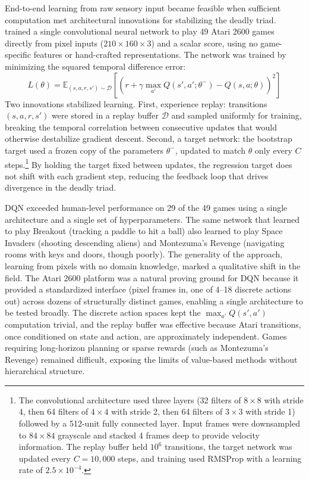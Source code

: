 End-to-end learning from raw sensory input became feasible when sufficient computation met architectural innovations for stabilizing the deadly triad. \citet{mnih2015} trained a single convolutional neural network to play 49 Atari 2600 games directly from pixel inputs ($210 \times 160 \times 3$) and a scalar score, using no game-specific features or hand-crafted representations. The network was trained by minimizing the squared temporal difference error:
\begin{equation}
L(\theta) = \mathbb{E}_{(s,a,r,s') \sim \mathcal{D}} \left[ \left( r + \gamma \max_{a'} Q(s', a'; \theta^-) - Q(s, a; \theta) \right)^2 \right]
\end{equation}
Two innovations stabilized learning. First, experience replay: transitions $(s, a, r, s')$ were stored in a replay buffer $\mathcal{D}$ and sampled uniformly for training, breaking the temporal correlation between consecutive updates that would otherwise destabilize gradient descent. Second, a target network: the bootstrap target used a frozen copy of the parameters $\theta^-$, updated to match $\theta$ only every $C$ steps.\footnote{The convolutional architecture used three layers (32 filters of $8 \times 8$ with stride 4, then 64 filters of $4 \times 4$ with stride 2, then 64 filters of $3 \times 3$ with stride 1) followed by a 512-unit fully connected layer. Input frames were downsampled to $84 \times 84$ grayscale and stacked 4 frames deep to provide velocity information. The replay buffer held $10^6$ transitions, the target network was updated every $C = 10{,}000$ steps, and training used RMSProp with a learning rate of $2.5 \times 10^{-4}$.} By holding the target fixed between updates, the regression target does not shift with each gradient step, reducing the feedback loop that drives divergence in the deadly triad.

DQN exceeded human-level performance on 29 of the 49 games using a single architecture and a single set of hyperparameters. The same network that learned to play Breakout (tracking a paddle to hit a ball) also learned to play Space Invaders (shooting descending aliens) and Montezuma's Revenge (navigating rooms with keys and doors, though poorly). The generality of the approach, learning from pixels with no domain knowledge, marked a qualitative shift in the field. The Atari 2600 platform was a natural proving ground for DQN because it provided a standardized interface (pixel frames in, one of 4--18 discrete actions out) across dozens of structurally distinct games, enabling a single architecture to be tested broadly. The discrete action spaces kept the $\max_{a'} Q(s',a')$ computation trivial, and the replay buffer was effective because Atari transitions, once conditioned on state and action, are approximately independent. Games requiring long-horizon planning or sparse rewards (such as Montezuma's Revenge) remained difficult, exposing the limits of value-based methods without hierarchical structure.

